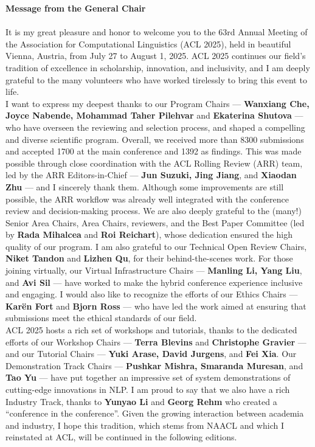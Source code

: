 \textbf{Message from the General Chair}\\
\\

It is my great pleasure and honor to welcome you to the 63rd Annual Meeting of the Association for Computational Linguistics (ACL 2025), held in beautiful Vienna, Austria, from July 27 to August 1, 2025. ACL 2025 continues our field’s tradition of excellence in scholarship, innovation, and inclusivity, and I am deeply grateful to the many volunteers who have worked tirelessly to bring this event to life.\\


I want to express my deepest thanks to our Program Chairs	--- \textbf{Wanxiang Che, Joyce Nabende, Mohammad Taher Pilehvar} and \textbf{Ekaterina Shutova} --- who have overseen the reviewing and selection process, and shaped a compelling and diverse scientific program. Overall, we received more than 8300 submissions and accepted 1700 at the main conference and 1392 as findings. This was made possible through close coordination with the ACL Rolling Review (ARR) team, led by the ARR Editors-in-Chief --- \textbf{Jun Suzuki, Jing Jiang}, and \textbf{Xiaodan Zhu} --- and I sincerely thank them. Although some improvements are still possible, the ARR workflow was already well integrated with the conference review and decision-making process. We are also deeply grateful to the (many!) Senior Area Chairs, Area Chairs, reviewers, and the Best Paper Committee (led by \textbf{Rada Mihalcea} and \textbf{Roi Reichart}), whose dedication ensured the high quality of our program. I am also grateful to our Technical Open Review Chairs, \textbf{Niket Tandon} and \textbf{Lizhen Qu}, for their behind-the-scenes work. For those joining virtually, our Virtual Infrastructure Chairs --- \textbf{Manling Li, Yang Liu}, and \textbf{Avi Sil} --- have worked to make the hybrid conference experience inclusive and engaging. I would also like to recognize the efforts of our Ethics Chairs --- \textbf{Karën Fort} and \textbf{Bjorn Ross} --- who have led the work aimed at ensuring that submissions meet the ethical standards of our field. \\


ACL 2025 hosts a rich set of workshops and tutorials, thanks to the dedicated efforts of our Workshop Chairs 	--- \textbf{Terra Blevins} and \textbf{Christophe Gravier} --- and our Tutorial Chairs --- \textbf{Yuki Arase, David Jurgens}, and \textbf{Fei Xia}. Our Demonstration Track Chairs --- \textbf{Pushkar Mishra, Smaranda Muresan}, and \textbf{Tao Yu} --- have put together an impressive set of system demonstrations of cutting-edge innovations in NLP. I am proud to say that we also have a rich Industry Track, thanks to \textbf{Yunyao Li} and \textbf{Georg Rehm} who created a “conference in the conference”. Given the growing interaction between academia and industry, I hope this tradition, which stems from NAACL and which I reinstated at ACL, will be continued in the following editions.\\


